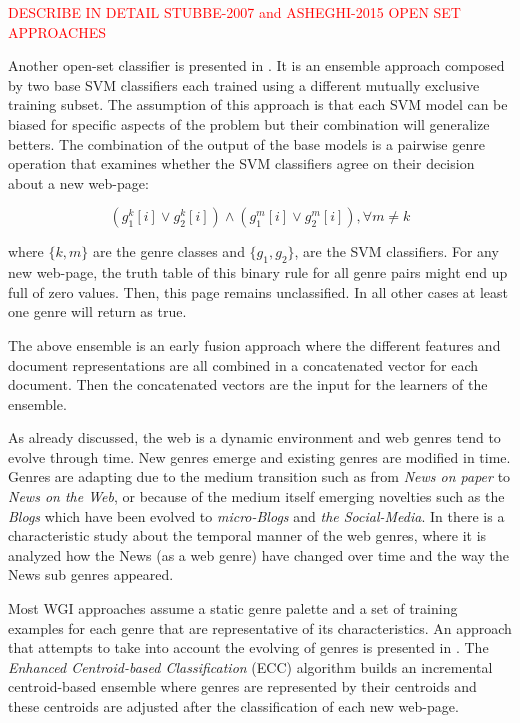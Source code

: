 \textcolor{red}{DESCRIBE IN DETAIL STUBBE-2007 and ASHEGHI-2015 OPEN SET APPROACHES}

Another open-set classifier is presented in \parencite{chen2012genre}. It is an ensemble approach composed by two base SVM classifiers each trained using a different mutually exclusive training subset. The assumption of this approach is that each SVM model can be biased for specific aspects of the problem but their combination will generalize betters. The combination of the output of the base models is a pairwise genre operation that examines whether the SVM classifiers agree on their decision about a new web-page:

\begin{equation}\label{eq:office_doc_ensemble}
	(g^{k}_{1}[i] \vee g^{k}_{2}[i])  \wedge  (g^{m}_{1}[i] \vee g^{m}_{2}[i]) ,   \forall m \neq k
\end{equation}

where $\{k, m\}$ are the genre classes and $\{g_{1}, g_{2}\}$, are the SVM classifiers. For any new web-page, the truth table of this binary rule for all genre pairs might end up full of zero values. Then, this page remains unclassified. In all other cases at least one genre will return as true. 
		
The above ensemble is an early fusion approach where the different features and document representations are all combined in a concatenated vector for each document. Then the concatenated vectors are the input for the learners of the ensemble.

As already discussed, the web is a dynamic environment and web genres tend to evolve through time. New genres  emerge and existing genres are modified in time. Genres are adapting due to the medium transition such as from \textit{News on paper} to \textit{News on the Web}, or because of the medium itself emerging novelties such as the \textit{Blogs} which have been evolved to \textit{micro-Blogs} and \textit{the Social-Media}. In \parencite{caple2017genre} there is a characteristic study about the temporal manner of the web genres, where it is analyzed how the News (as a web genre) have changed over time and the way the News sub genres appeared.

Most WGI approaches assume a static genre palette and a set of training examples for each genre that are representative of its characteristics. An approach that attempts to take into account the evolving of genres is presented in . The \textit{Enhanced Centroid-based Classification} (ECC) algorithm builds an incremental centroid-based ensemble where genres are represented by their centroids and these centroids are adjusted after the classification of each new web-page.

